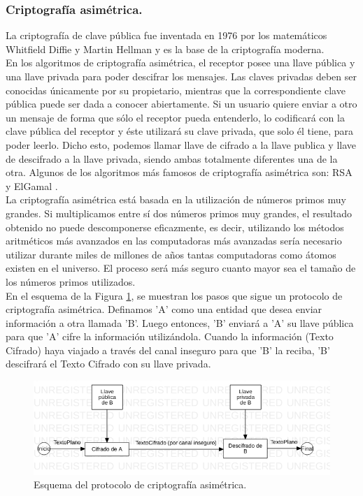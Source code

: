 \documentclass[12pt, a4paper, titlepage]{report}
\begin{document}
        		\subsubsection{Criptografía asimétrica.}
        		La  criptografía  de  clave  pública  fue  inventada  en 1976  por  los  matemáticos  Whitfield Diffie y Martin Hellman y es la base de la criptografía moderna. \\
        		En los algoritmos de criptografía asimétrica, el receptor posee una llave pública y una llave privada para poder descifrar los mensajes. Las claves privadas deben ser conocidas únicamente por su propietario, mientras que la correspondiente clave pública puede ser dada a conocer abiertamente. Si un usuario quiere enviar a otro un mensaje de forma que sólo el receptor pueda entenderlo, lo codificará con la clave pública del receptor y éste utilizará su clave privada, que solo él tiene, para poder leerlo. Dicho esto, podemos llamar llave de cifrado a la llave publica y llave de descifrado a la llave privada, siendo ambas totalmente diferentes una de la otra. Algunos de los algoritmos más famosos de criptografía asimétrica son: RSA y ElGamal \cite{refCriptografia}.\\
        		La criptografía asimétrica está basada en la utilización de números primos muy grandes. Si multiplicamos entre sí dos números primos muy grandes, el resultado obtenido no puede descomponerse eficazmente, es decir, utilizando los métodos aritméticos más avanzados en las computadoras más avanzadas sería necesario utilizar durante miles de millones de años tantas computadoras como átomos existen en el universo. El proceso será más seguro cuanto mayor sea el tamaño de los números primos utilizados.\\
        		
        		En el esquema de la Figura \ref{fig:criptoAsimetrica}, se muestran los pasos que sigue un protocolo de criptografía asimétrica. Definamos 'A' como una entidad que desea enviar información a otra llamada 'B'. Luego entonces, 'B' enviará a 'A' su llave pública para que 'A' cifre la información utilizándola. Cuando la información (Texto Cifrado) haya viajado a través del canal inseguro para que 'B' la reciba, 'B' descifrará el Texto Cifrado con su llave privada.
        		
        		\begin{figure}[H]
        			\begin{center}	                  \includegraphics[width=14cm]{./imagenes/MarcoTeorico/cripto_asimetrica.png}
        				\caption{Esquema del protocolo de criptografía asimétrica.}
        				\label{fig:criptoAsimetrica}
        			\end{center}
        		\end{figure}
        		
\end{document}
